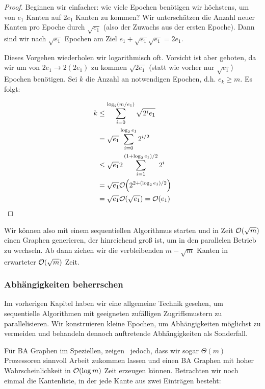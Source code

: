 \begin{proof}
    Beginnen wir einfacher: wie viele Epochen benötigen wir höchstens, um von $e_1$ Kanten auf $2e_1$ Kanten zu kommen?
    Wir unterschätzen die Anzahl neuer Kanten pro Epoche durch $\sqrt{e_1}$ (also der Zuwachs aus der ersten Epoche).
    Dann sind wir nach $\sqrt{e_1}$ Epochen am Ziel $e_1 + \sqrt{e_1} \sqrt{e_1} = 2 e_1$.

    Dieses Vorgehen wiederholen wir logarithmisch oft.
    Vorsicht ist aber geboten, da wir um von $2e_1 \to 2(2e_1)$ zu kommen $\sqrt{2 e_1}$ (statt wie vorher nur $\sqrt{e_1}$) Epochen benötigen.
    Sei $k$ die Anzahl an notwendigen Epochen, d.h. $e_k \ge m$.
    Es folgt:

    \begin{align}
        k & \le \sum_{i=0}^{\log_2(m/e_1)} \sqrt{2^i e_1}      \\
          & = \sqrt{e_1} \sum_{i=0}^{\log_2 e_1} 2^{i/2}       \\
          & \le \sqrt{e_1} 2 \sum_{i=1}^{(1+\log_2 e_1)/2} 2^i \\
          & = \sqrt{e_1} \mathcal{O}\!\left(2^{2 + (\log_2 e_1) / 2}\right)         \\
          & = \sqrt{e_1} \mathcal{O}\!\left(\sqrt{e_1}\right) = \mathcal{O}\!\left(e_1\right)
    \end{align}
\end{proof}

Wir können also mit einem sequentiellen Algorithmus starten und in Zeit $\mathcal{O}\!\left(\sqrt m\right)$ einen Graphen generieren, der hinreichend groß ist, um in den parallelen Betrieb zu wechseln.
Ab dann ziehen wir die verbleibenden $m - \sqrt{m}$ Kanten in erwarteter $\mathcal{O}\!\left(\sqrt m\right)$ Zeit.

\subsubsection{Abhängigkeiten beherrschen}\label{subsec:ba_sanders}
Im vorherigen Kapitel haben wir eine allgemeine Technik gesehen, um sequentielle Algorithmen mit geeigneten zufälligen Zugriffsmustern zu parallelisieren.
Wir konstruieren kleine Epochen, um Abhängigkeiten möglichst zu vermeiden und behandeln dennoch auftretende Abhängigkeiten als Sonderfall.

Für BA Graphen im Speziellen, zeigen~\cite{SANDERS2016489} jedoch, dass wir sogar $\Theta(m)$ Prozessoren sinnvoll Arbeit zukommen lassen und einen BA Graphen mit hoher Wahrscheinlichkeit in $\mathcal{O}\!\left(\log m\right)$ Zeit erzeugen können.
Betrachten wir noch einmal die  Kantenliste, in der jede Kante aus zwei Einträgen besteht:


